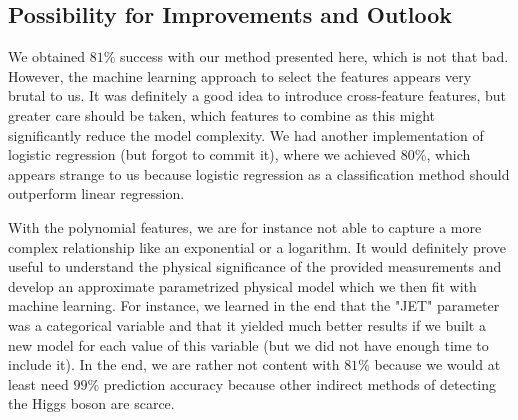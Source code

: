 \documentclass[10pt,conference,compsocconf]{IEEEtran}
\begin{document}
\subsection{Possibility for Improvements and Outlook}
We obtained $81\%$ success with our method presented here, which is not that bad.
However, the machine learning approach to select the features appears very brutal to us. It was definitely a good idea to introduce cross-feature features, but greater care should be taken, which features to combine as this might significantly reduce the model complexity. We had another implementation of logistic regression (but forgot to commit it), where we achieved 80\%, which appears strange to us because logistic regression as a classification method should outperform linear regression.

With the polynomial features, we are for instance not able to capture a more complex relationship like an exponential or a logarithm. It would definitely prove useful to understand the physical significance of the provided measurements and develop an approximate parametrized physical model which we then fit with machine learning. For instance, we learned in the end that the "JET" parameter was a categorical variable and that it yielded much better results if we built a new model for each value of this variable (but we did not have enough time to include it). In the end, we are rather not content with $81\%$ because we would at least need $99\%$ prediction accuracy because other indirect methods of detecting the Higgs boson are scarce.




%
%
\end{document}
